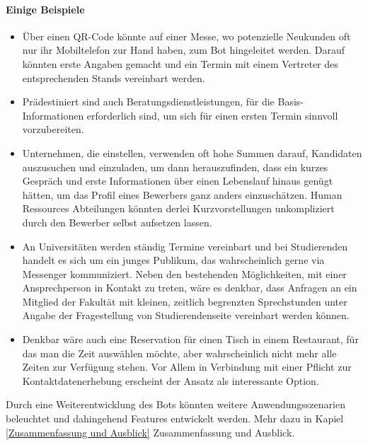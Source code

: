 \paragraph{Einige Beispiele}
\begin{itemize}
    \item Über einen QR-Code könnte auf einer Messe, wo potenzielle Neukunden oft nur ihr Mobiltelefon zur Hand haben, zum Bot hingeleitet werden. Darauf könnten erste Angaben gemacht und ein Termin mit einem Vertreter des entsprechenden Stands vereinbart werden. 
    \item Prädestiniert sind auch Beratungsdienstleistungen, für die Basis-Informationen erforderlich sind, um sich für einen ersten Termin sinnvoll vorzubereiten.
    \item Unternehmen, die einstellen, verwenden oft hohe Summen darauf, Kandidaten auszusuchen und einzuladen, um dann herauszufinden, dass ein kurzes Gespräch und erste Informationen über einen Lebenslauf hinaus genügt hätten, um das Profil eines Bewerbers ganz anders einzuschätzen. Human Ressources Abteilungen könnten derlei Kurzvorstellungen unkompliziert durch den Bewerber selbst aufsetzen lassen.
    \item An Universitäten werden ständig Termine vereinbart und bei Studierenden handelt es sich um ein junges Publikum, das wahrscheinlich gerne via Messenger kommuniziert. Neben den bestehenden Möglichkeiten, mit einer Ansprechperson in Kontakt zu treten, wäre es denkbar, dass Anfragen an ein Mitglied der Fakultät mit kleinen, zeitlich begrenzten Sprechstunden unter Angabe der Fragestellung von Studierendenseite vereinbart werden können.
    \item Denkbar wäre auch eine Reservation für einen Tisch in einem Restaurant, für das man die Zeit auswählen möchte, aber wahrscheinlich nicht mehr alle Zeiten zur Verfügung stehen. Vor Allem in Verbindung mit einer Pflicht zur Kontaktdatenerhebung erscheint der Ansatz als interessante Option.
\end{itemize}

Durch eine Weiterentwicklung des Bots könnten weitere Anwendungsszenarien beleuchtet und dahingehend Features entwickelt werden. Mehr dazu in Kapiel \ref*{Zusammenfassung und Ausblick} Zusammenfassung und Ausblick.